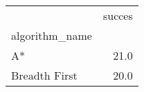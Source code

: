 \begin{tabular}{lr}
\toprule
{} &  succes \\
algorithm\_name &         \\
\midrule
A*             &    21.0 \\
Breadth First  &    20.0 \\
\bottomrule
\end{tabular}
